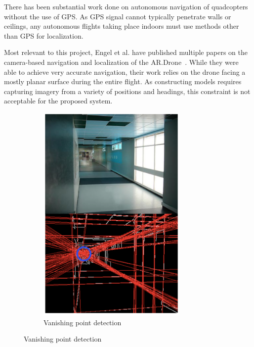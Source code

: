 	There has been substantial work done on autonomous navigation of quadcopters without the use of GPS. As GPS signal cannot typically penetrate walls or ceilings, any autonomous flights taking place indoors must use methods other than GPS for localization. 

    Most relevant to this project, Engel et al. have published multiple papers on the camera-based navigation and localization of the AR.Drone~\cite{Engel, Engel2}. While they were able to achieve very accurate navigation, their work relies on the drone facing a mostly planar surface during the entire flight. As constructing models requires capturing imagery from a variety of positions and headings, this constraint is not acceptable for the proposed system.

	\begin{figure}[ht]
            \centering
            \begin{subfigure}[b]{0.5\textwidth}
                    \centering
                    \includegraphics[width=0.8\textwidth]{../images/Bills1.png}
                    \caption{Vanishing point detection}
            \end{subfigure}%

\end{figure}
